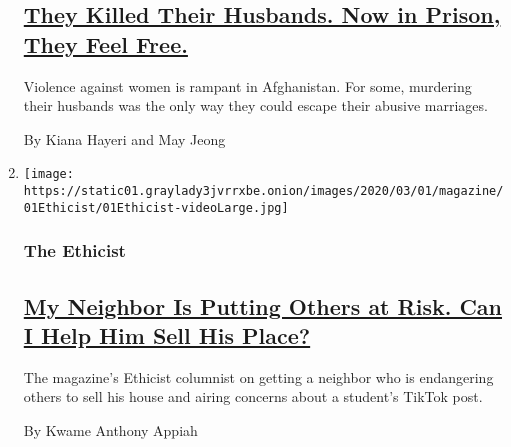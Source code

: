 \begin{enumerate}
  \hypertarget{they-killed-their-husbands-now-in-prison-they-feel-free}{%
  \subsection{\texorpdfstring{\href{/2020/02/26/magazine/afghan-women-prison.html}{They
  Killed Their Husbands. Now in Prison, They Feel
  Free.}}{They Killed Their Husbands. Now in Prison, They Feel Free.}}\label{they-killed-their-husbands-now-in-prison-they-feel-free}}

  Violence against women is rampant in Afghanistan. For some, murdering
  their husbands was the only way they could escape their abusive
  marriages.

  By Kiana Hayeri and May Jeong
\item
  \texttt{[image: https://static01.graylady3jvrrxbe.onion/images/2020/03/01/magazine/01Ethicist/01Ethicist-videoLarge.jpg]}

  \hypertarget{the-ethicist}{%
  \subsubsection{The Ethicist}\label{the-ethicist}}

  \hypertarget{my-neighbor-is-putting-others-at-risk-can-i-help-him-sell-his-place}{%
  \subsection{\texorpdfstring{\href{/2020/02/25/magazine/my-neighbor-is-putting-others-at-risk-can-i-help-him-sell-his-place.html}{My
  Neighbor Is Putting Others at Risk. Can I Help Him Sell His
  Place?}}{My Neighbor Is Putting Others at Risk. Can I Help Him Sell His Place?}}\label{my-neighbor-is-putting-others-at-risk-can-i-help-him-sell-his-place}}

  The magazine's Ethicist columnist on getting a neighbor who is
  endangering others to sell his house and airing concerns about a
  student's TikTok post.

  By Kwame Anthony Appiah
\end{enumerate}

